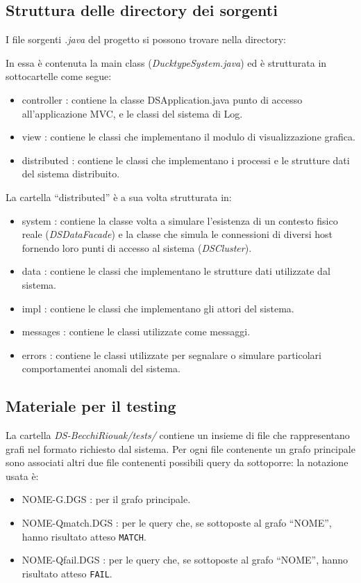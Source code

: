 \subsection{Struttura delle directory dei sorgenti}
I file sorgenti \emph{.java} del progetto si possono trovare nella directory:


In essa è contenuta la main class (\emph{DucktypeSystem.java})
ed è strutturata in sottocartelle come segue:
\begin{itemize}
\item controller : contiene la classe DSApplication.java punto di accesso
  all'applicazione MVC, e le classi del sistema di Log.
\item view : contiene le classi che implementano il modulo di visualizzazione grafica.
\item distributed : contiene le classi che implementano i processi e le strutture
  dati del sistema distribuito.
\end{itemize}

La cartella ``distributed'' è a sua volta strutturata in:
\begin{itemize}
\item system : contiene la classe volta a simulare l'esistenza di un
  contesto fisico reale (\emph{DSDataFacade})
  e la classe che simula le connessioni di diversi host
  fornendo loro punti di accesso al sistema (\emph{DSCluster}).
\item data : contiene le classi che implementano le strutture dati
  utilizzate dal sistema.
\item impl : contiene le classi che implementano gli attori del sistema.
\item messages : contiene le classi utilizzate come messaggi.
\item errors : contiene le classi utilizzate per segnalare o simulare
  particolari comportamentei anomali del sistema.
\end{itemize}

\subsection{Materiale per il testing}
La cartella \emph{DS-BecchiRiouak/tests/} contiene un insieme di file che
rappresentano grafi nel formato richiesto dal sistema.
Per ogni file contenente un grafo principale sono associati
altri due file contenenti possibili query da sottoporre: la notazione
usata è:
\begin{itemize}
\item NOME-G.DGS : per il grafo principale.
\item NOME-Qmatch.DGS : per le query che, se sottoposte al grafo ``NOME'',
  hanno risultato atteso \texttt{MATCH}.
\item NOME-Qfail.DGS : per le query che, se sottoposte al grafo ``NOME'',
  hanno risultato atteso \texttt{FAIL}.
\end{itemize}

